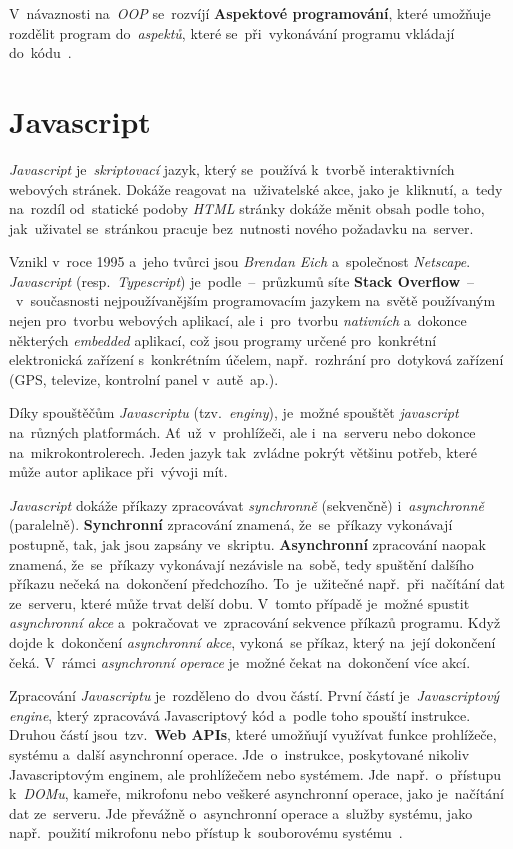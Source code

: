 \documentclass[11pt,a4paper]{report}
\begin{document}
            V~návaznosti na~\emph{OOP} se~rozvíjí \textbf{Aspektové programování}, které umožňuje rozdělit program do~\emph{aspektů}, které se~při~vykonávání programu vkládají do~kódu~\cite{macurova2012:aspektove}.

        \section{Javascript}
            \emph{Javascript} je~\emph{skriptovací} jazyk, který se~používá k~tvorbě interaktivních webových stránek. Dokáže reagovat na~uživatelské akce, jako je~kliknutí, a~tedy na~rozdíl od~statické podoby \emph{HTML} stránky dokáže měnit obsah podle toho, jak~uživatel se~stránkou pracuje bez~nutnosti nového požadavku na~server.

            Vznikl v~roce 1995 a~jeho tvůrci jsou \emph{Brendan Eich} a~společnost \emph{Netscape}. \emph{Javascript} (resp.~\emph{Typescript}) je~podle~--~průzkumů síte \textbf{Stack Overflow}~--~v~současnosti nejpoužívanějším programovacím jazykem na~světě používaným nejen pro~tvorbu webových aplikací, ale i~pro~tvorbu \emph{nativních} a~dokonce některých \emph{embedded} aplikací, což jsou programy určené pro~konkrétní elektronická zařízení s~konkrétním účelem, např.~rozhrání pro~dotyková zařízení (GPS, televize, kontrolní panel v~autě~ap.).

            Díky spouštěčům \emph{Javascriptu} (tzv.~\emph{enginy}), je~možné spouštět \emph{javascript} na~různých platformách. Ať~už~v~prohlížeči, ale i~na~serveru nebo dokonce na~mikrokontrolerech. Jeden jazyk tak~zvládne pokrýt většinu potřeb, které může autor aplikace při~vývoji mít.

            \emph{Javascript} dokáže příkazy zpracovávat \emph{synchronně} (sekvenčně) i~\emph{asynchronně} (paralelně). \textbf{Synchronní} zpracování znamená, že~se~příkazy vykonávají postupně, tak, jak jsou zapsány ve~skriptu. \textbf{Asynchronní} zpracování naopak znamená, že~se~příkazy vykonávají nezávisle na~sobě, tedy spuštění dalšího příkazu nečeká na~dokončení předchozího. To~je~užitečné např.~při~načítání dat ze~serveru, které může trvat delší dobu. V~tomto případě je~možné spustit \emph{asynchronní akce} a~pokračovat ve~zpracování sekvence příkazů programu. Když dojde k~dokončení \emph{asynchronní akce}, vykoná~se příkaz, který na~její dokončení čeká. V~rámci \emph{asynchronní operace} je~možné čekat na~dokončení více akcí.

            Zpracování \emph{Javascriptu} je~rozděleno do~dvou částí. První částí je~\emph{Javascriptový engine}, který zpracovává Javascriptový kód a~podle toho spouští instrukce. Druhou částí jsou~tzv.~\textbf{Web APIs}, které umožňují využívat funkce prohlížeče, systému a~další {asynchronní} operace. Jde~o~instrukce, poskytované nikoliv Javascriptovým enginem, ale prohlížečem nebo systémem. Jde~např.~o~přístupu k~\emph{DOMu}, kameře, mikrofonu nebo veškeré asynchronní operace, jako je~načítání dat ze~serveru. Jde převážně o~asynchronní operace a~služby systému, jako např.~použití mikrofonu nebo přístup k~souborovému systému~\cite{kantor_javascript}.
\end{document}
